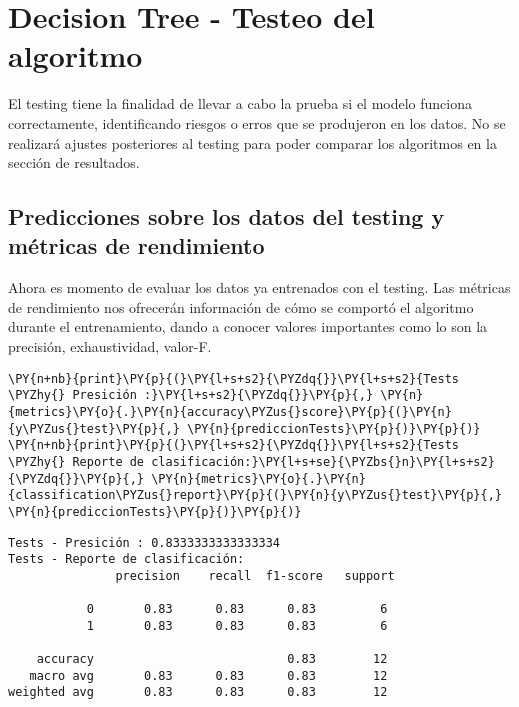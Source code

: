     \hypertarget{decision-tree---testeo-del-algoritmo}{%
\section{Decision Tree - Testeo del
algoritmo}\label{decision-tree---testeo-del-algoritmo}}

El testing tiene la finalidad de llevar a cabo la prueba si el modelo
funciona correctamente, identificando riesgos o erros que se produjeron
en los datos. No se realizará ajustes posteriores al testing para poder
comparar los algoritmos en la sección de resultados.

    \hypertarget{predicciones-sobre-los-datos-del-testing-y-muxe9tricas-de-rendimiento}{%
\subsection{Predicciones sobre los datos del testing y métricas de
rendimiento}\label{predicciones-sobre-los-datos-del-testing-y-muxe9tricas-de-rendimiento}}

Ahora es momento de evaluar los datos ya entrenados con el testing. Las
métricas de rendimiento nos ofrecerán información de cómo se comportó el
algoritmo durante el entrenamiento, dando a conocer valores importantes
como lo son la precisión, exhaustividad, valor-F.

    \begin{tcolorbox}[breakable, size=fbox, boxrule=1pt, pad at break*=1mm,colback=cellbackground, colframe=cellborder]
\begin{Verbatim}[commandchars=\\\{\}]
\PY{n+nb}{print}\PY{p}{(}\PY{l+s+s2}{\PYZdq{}}\PY{l+s+s2}{Tests \PYZhy{} Presición :}\PY{l+s+s2}{\PYZdq{}}\PY{p}{,} \PY{n}{metrics}\PY{o}{.}\PY{n}{accuracy\PYZus{}score}\PY{p}{(}\PY{n}{y\PYZus{}test}\PY{p}{,} \PY{n}{prediccionTests}\PY{p}{)}\PY{p}{)}
\PY{n+nb}{print}\PY{p}{(}\PY{l+s+s2}{\PYZdq{}}\PY{l+s+s2}{Tests \PYZhy{} Reporte de clasificación:}\PY{l+s+se}{\PYZbs{}n}\PY{l+s+s2}{\PYZdq{}}\PY{p}{,} \PY{n}{metrics}\PY{o}{.}\PY{n}{classification\PYZus{}report}\PY{p}{(}\PY{n}{y\PYZus{}test}\PY{p}{,} \PY{n}{prediccionTests}\PY{p}{)}\PY{p}{)}
\end{Verbatim}
\end{tcolorbox}

    \begin{Verbatim}[commandchars=\\\{\}]
Tests - Presición : 0.8333333333333334
Tests - Reporte de clasificación:
               precision    recall  f1-score   support

           0       0.83      0.83      0.83         6
           1       0.83      0.83      0.83         6

    accuracy                           0.83        12
   macro avg       0.83      0.83      0.83        12
weighted avg       0.83      0.83      0.83        12

    \end{Verbatim}

